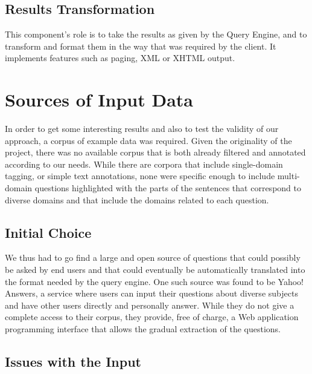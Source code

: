 \subsection{Results Transformation} %
\label{sub:results_transformation}
This component's role is to take the results as given by the Query Engine, and to transform and format them in the way that was required by the client. It implements features such as paging, XML or XHTML output.


\section{Sources of Input Data} %
\label{sec:sources_of_input_data}

In order to get some interesting results and also to test the validity of our approach, a corpus of example data was required. Given the originality of the project, there was no available corpus that is both already filtered and annotated according to our needs. While there are corpora that include single-domain tagging, or simple text annotations, none were specific enough to include multi-domain questions highlighted with the parts of the sentences that correspond to diverse domains and that include the domains related to each question.

\subsection{Initial Choice} %
\label{sub:initial_choice}

We thus had to go find a large and open source of questions that could possibly be asked by end users and that could eventually be automatically translated into the format needed by the query engine. One such source was found to be Yahoo! Answers, a service where users can input their questions about diverse subjects and have other users directly and personally answer. While they do not give a complete access to their corpus, they provide, free of charge, a Web application programming interface that allows the gradual extraction of the questions.



\subsection{Issues with the Input} %
\label{sub:issues_with_the_input}

